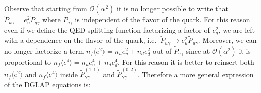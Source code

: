 \documentclass[a4paper,oneside]{article}
\begin{document}
Observe that starting from $\mathcal{O}(\alpha^2)$ it is no longer possible to write that $\tilde{P}_{u \gamma}=e_u^2 \tilde{P}_{q \gamma}$ where $\tilde{P}_{q \gamma}$ is independent of the flavor of the quark. For this reason even if we define the QED splitting function factorizing a factor of $e_q^2$, we are left with a dependence on the flavor of the quark, i.e.\ $\tilde{P}_{u \gamma} \rightarrow e_u^2 \tilde{P}_{u \gamma}$. Moreover, we can no longer factorize a term $n_f \langle e^2\rangle=n_u e_u^2+n_d e_d^2$ out of $\tilde{P}_{\gamma \gamma}$ since at $\mathcal{O}(\alpha^2)$ it is proportional to $n_f \langle e^4\rangle=n_u e_u^4+n_d e_d^4$. For this reason it is better to reinsert both $n_f \langle e^2\rangle$ and $n_f \langle e^4\rangle$ inside $\tilde{P}_{\gamma \gamma}^{(1,1)}$ and $\tilde{P}_{\gamma \gamma}^{(0,2)}$.
Therefore a more general expression of the DGLAP equations is:
\end{document}
